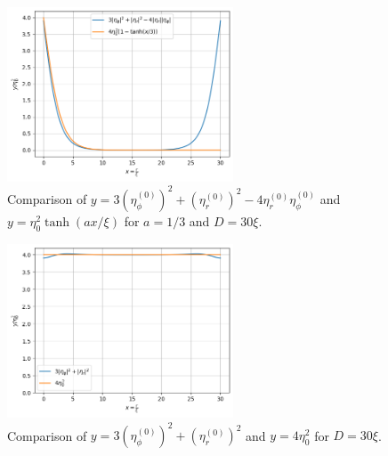 \documentclass[aps,prl,preprint]{revtex4-2}
\begin{document}
\begin{figure}[h]
    \centering
    \includegraphics[width=0.6\textwidth]{../figures/numerator.png}
    \caption{Comparison of
        $y=3\left(\eta^{(0)}_\phi\right)^2 + \left(\eta^{(0)}_r\right)^2-4\eta^{(0)}_r\eta^{(0)}_\phi$
        and $y=\eta_0^2\tanh(ax/\xi)$ for $a=1/3$ and $D=30\xi$.}
    \label{fig:numerator}
\end{figure}
\begin{figure}[h]
    \centering
    \includegraphics[width=0.6\textwidth]{../figures/denominator.png}
    \caption{Comparison of
        $y=3\left(\eta^{(0)}_\phi\right)^2 + \left(\eta^{(0)}_r\right)^2$
        and $y=4\eta_0^2$ for $D=30\xi$.}
    \label{fig:denominator}
\end{figure}
\end{document}
